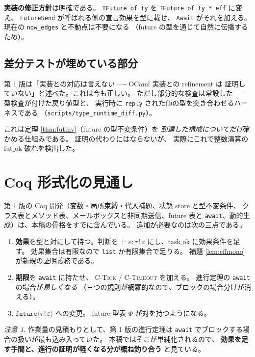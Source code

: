 \documentclass[11pt,a4paper]{ltjsarticle}
\theoremstyle{definition}
\theoremstyle{remark}
\newtheorem{remark}[theorem]{注意}
\newcommand{\tfut}[2]{\ensuremath{\mathtt{future}\langle #1 \,!\, #2 \rangle}}
\newcommand{\Ph}{\Phi}
\newcommand{\taskok}{\mathrm{task\_ok}}
\newcommand{\futok}{\mathrm{fut\_ok}}
\begin{document}
\textbf{実装の修正方針}は明確である。
\texttt{TFuture of ty} を \texttt{TFuture of ty * eff} に変え、
\texttt{FutureSend} が呼ばれる側の宣言効果を型に載せ、
\texttt{Await} がそれを加える。
現在の \texttt{now\_edges} と不動点は不要になる
（future の型を通じて自然に伝播するため）。

\subsection{差分テストが埋めている部分}

第 1 版は「実装との対応は言えない ---- OCaml 実装との refinement は
証明していない」と述べた。これは今も正しい。
ただし部分的な検査は常設した ---- 型検査が付けた戻り値型と、
実行時に \texttt{reply} された値の型を突き合わせるハーネスである
（\texttt{scripts/type\_runtime\_diff.py}）。

これは定理 \ref{thm:futinv}（future の型不変条件）を
\emph{到達した構成についてだけ}確かめる仕組みである。
証明の代わりにはならないが、
実際にこれで整数演算の $\futok$ 破れを検出した。

\section{Coq 形式化の見通し}

第 1 版の Coq 開発（変数・局所束縛・代入補題、状態 store と型不変条件、
クラス表とメソッド表、メールボックスと非同期送信、future 表と
\texttt{await}、動的生成）は、本稿の骨格をすでに含んでいる。
追加が必要なのは次の三点である。

\begin{enumerate}
\item \textbf{効果}を型と対にして持つ。判断を
  $\vdash e : \tau \,!\, \varepsilon$ にし、$\taskok$ に効果条件を足す。
  効果集合は有限なので \texttt{list} か有限集合で足りる。
  補題 \ref{lem:effmono} が新規の証明義務である。
\item \textbf{期限}を \texttt{await} に持たせ、
  \textsc{C-Tick} / \textsc{C-Timeout} を加える。
  進行定理の \texttt{await} の場合が\emph{易しくなる}
  （三つの規則が網羅的なので、ブロックの場合分けが消える）。
\item $\tfut{\tau}{\varepsilon}$ への変更。
  future 型表 $\Ph$ が対を持つようになる。
\end{enumerate}

\begin{remark}
作業量の見積もりとして、第 1 版の進行定理は
\texttt{await} でブロックする場合の扱いが最も込み入っていた。
本稿ではそこが単純化されるので、
\textbf{効果を足す手間と、進行の証明が軽くなる分が概ね釣り合う}
と見ている。
\end{remark}
\end{document}
